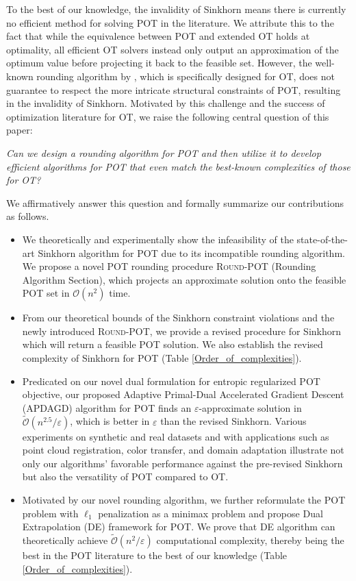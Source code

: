 To the best of our knowledge, the invalidity of Sinkhorn means there is currently no efficient method for solving POT in the literature. We attribute this to the fact that while the equivalence between POT and extended OT holds at optimality, all efficient OT solvers instead only output an approximation of the optimum value before projecting it back to the feasible set. However, the well-known rounding algorithm by \citep{altschuler2017near}, which is specifically designed for OT, does not guarantee to respect the more intricate structural constraints of POT, resulting in the invalidity of Sinkhorn. Motivated by this challenge and the success of optimization literature for OT, we raise the following central question of this paper: 
\begin{center}
\emph{Can we design a rounding algorithm for POT and then utilize it to develop efficient algorithms for POT that even match the best-known complexities of those for OT?} 
\end{center}
We affirmatively answer this question and formally summarize our contributions as follows.

\begin{itemize}
    \item We theoretically and experimentally show the infeasibility of the state-of-the-art Sinkhorn algorithm for POT  due to its incompatible rounding algorithm. We propose a novel POT rounding procedure \textsc{Round-POT} (Rounding Algorithm Section), which projects an approximate solution onto the feasible POT set in $\mathcal{O}(n^2)$ time. 
    \item From our theoretical bounds of the Sinkhorn constraint violations and the newly introduced \textsc{Round-POT}, we provide a revised procedure for Sinkhorn which will return a feasible POT solution. We also establish the revised complexity of Sinkhorn for POT (Table \ref{Order_of_complexities}).
    \item Predicated on our novel dual formulation for entropic regularized POT objective, our proposed Adaptive Primal-Dual Accelerated Gradient Descent (APDAGD) algorithm for POT finds an $\varepsilon$-approximate solution in  $\mathcal{\widetilde O}(n^{2.5}/\varepsilon)$, which is better in $\varepsilon$ than the revised Sinkhorn.  
    Various experiments on synthetic and real datasets and with applications such as point cloud registration, color transfer, and domain adaptation illustrate not only our algorithms' favorable performance against the pre-revised Sinkhorn but also the versatility of POT compared to OT. 
    \item Motivated by our novel rounding algorithm, we further reformulate the POT problem with $\ell_1$ penalization as a minimax problem and propose Dual Extrapolation (DE) framework for POT. We prove that DE algorithm can theoretically achieve $\mathcal{\widetilde O}(n^{2}/\varepsilon)$ computational complexity, thereby being the best in the POT literature to the best of our knowledge (Table \ref{Order_of_complexities}). 
\end{itemize}